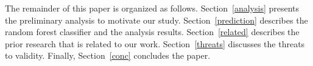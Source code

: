 
 
 
 
The remainder of this paper is organized as follows. Section~\ref{analysis} presents the preliminary analysis to motivate our study. Section~\ref{prediction} describes the random forest classifier and the analysis results. Section~\ref{related} describes the prior research that is related to our work. Section~\ref{threats} discusses the threats to validity. Finally, Section~\ref{conc} concludes the paper.
 
 
